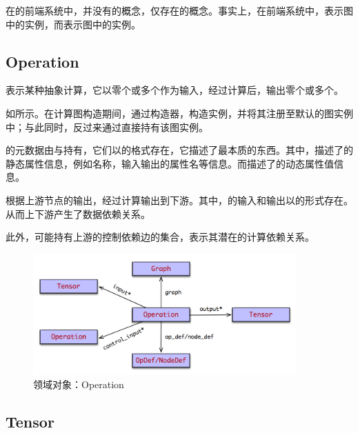 \begin{content}

在的前端系统中，并没有的概念，仅存在的概念。事实上，在前端系统中，表示图中的实例，而表示图中的实例。

\subsection{Operation}

表示某种抽象计算，它以零个或多个作为输入，经过计算后，输出零个或多个。

如所示。在计算图构造期间，通过构造器，构造实例，并将其注册至默认的图实例中；与此同时，反过来通过直接持有该图实例。

的元数据由与持有，它们以的格式存在，它描述了最本质的东西。其中，描述了的静态属性信息，例如名称，输入输出的属性名等信息。而描述了的动态属性值信息。

根据上游节点的输出，经过计算输出到下游。其中，的输入和输出以的形式存在。从而上下游产生了数据依赖关系。

此外，可能持有上游的控制依赖边的集合，表示其潜在的计算依赖关系。

\begin{figure}[!htbp]
\centering
\includegraphics[width=0.9\textwidth]{figures/py-operation.png}
\caption{领域对象：Operation}
 \label{fig:py-operation}
\end{figure}

\subsection{Tensor}


\end{content}
